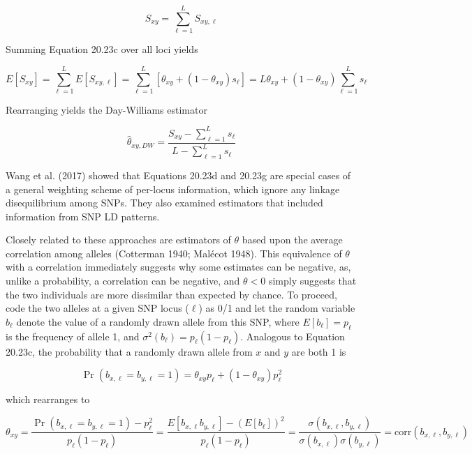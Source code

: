 \documentclass{article}
\begin{document}
\begin{equation}
S_{xy}=\sum_{\ell=1}^{L}S_{xy,\ell}
\tag{20.23e}
\label{eq:20_23e}
\end{equation}

Summing Equation 20.23c over all loci yields

\begin{equation}
E[S_{xy}]=\sum_{\ell=1}^{L}E[S_{xy,\ell}]=\sum_{\ell=1}^{L}[\theta_{xy}+(1-\theta_{xy})s_\ell]=L\theta_{xy}+(1-\theta_{xy})\sum_{\ell=1}^{L}s_\ell
\tag{20.23f}
\label{eq:20_23f}
\end{equation}

Rearranging yields the Day-Williams estimator

\begin{equation}
\widehat{\theta}_{x y,D W}=\frac{S_{x y}-\sum_{\ell=1}^{L}s_{\ell}}{L-\sum_{\ell=1}^{L}s_{\ell}}
\tag{20.23g}
\label{eq:20_23g}
\end{equation}

Wang et al. (2017) showed that Equations 20.23d and 20.23g are special cases of a general weighting scheme of per-locus information, which ignore any linkage disequilibrium among SNPs. They also examined estimators that included information from SNP LD patterns.

Closely related to these approaches are estimators of $\theta$ based upon the average correlation among alleles (Cotterman 1940; Malécot 1948). This equivalence of $\theta$ with a correlation immediately suggests why some estimates can be negative, as, unlike a probability, a correlation can be negative, and $\theta < 0$ simply suggests that the two individuals are more dissimilar than expected by chance. To proceed, code the two alleles at a given SNP locus ($\ell$) as 0/1 and let the random variable $b_{\ell}$ denote the value of a randomly drawn allele from this SNP, where $E[b_{\ell}] = p_{\ell}$ is the frequency of allele 1, and $\sigma^{2}(b_{\ell}) = p_{\ell}(1 - p_{\ell})$. Analogous to Equation 20.23c, the probability that a randomly drawn allele from $x$ and $y$ are both 1 is

\begin{equation}
\Pr(b_{x,\ell}=b_{y,\ell}=1)=\theta_{x y}p_{\ell}+(1-\theta_{x y})p_{\ell}^{2}
\tag{20.23h}
\label{eq:20_23h}
\end{equation}

which rearranges to

\begin{equation}
\theta_{xy}=\frac{\Pr(b_{x,\ell}=b_{y,\ell}=1)-p_{\ell}^{2}}{p_{\ell}(1-p_{\ell})}=\frac{E[b_{x,\ell}b_{y,\ell}]-(E[b_{\ell}])^{2}}{p_{\ell}(1-p_{\ell})}=\frac{\sigma(b_{x,\ell},b_{y,\ell})}{\sigma(b_{x,\ell})\sigma(b_{y,\ell})}=\mathrm{corr}(b_{x,\ell},b_{y,\ell})
\tag{20.23i}
\label{eq:20_23i}
\end{equation}
\end{document}
